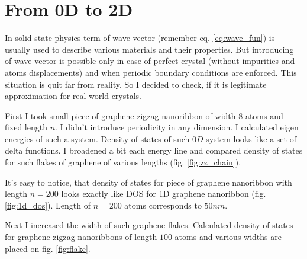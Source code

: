 \chapter{From 0D to 2D}
In solid state physics term of wave vector (remember eq. \ref{eq:wave_fun}) is usually used to describe various materials and their properties. But introducing of wave vector is possible only in case of perfect crystal (without impurities and atoms displacements) and when periodic boundary conditions are enforced. This situation is quit far from reality. So I decided to check, if it is legitimate approximation for real-world crystals.

First I took small piece of graphene zigzag nanoribbon of width $8$ atoms and fixed length $n$. I didn't introduce periodicity in any dimension. I calculated eigen energies of such a system. Density of states of such $0D$ system looks like a set of delta functions. I broadened a bit each energy line and compared density of states for such flakes of graphene of various lengths (fig. \ref{fig:zz_chain}).

It's easy to notice, that density of states for piece of graphene nanoribbon with length $n=200$ looks exactly like DOS for 1D graphene nanoribbon (fig. \ref{fig:1d_dos}). Length of $n=200$ atoms corresponds to $50 nm$.

Next I increased the width of such graphene flakes. Calculated density of states for graphene zigzag nanoribbons of length $100$ atoms and various widths are placed on fig. \ref{fig:flake}.

